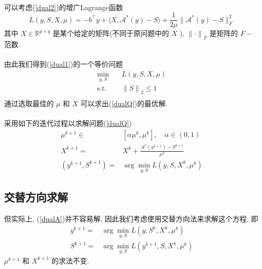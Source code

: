 \documentclass[UTF8]{ctexart}
\begin{document}
			\paragraph{}
				\quad 可以考虑(\ref{dual2})的增广Lagrange函数
				\begin{equation}\label{Lag}
						L(y, S, X, \mu)
					=	-b^\top y + \langle{X, \mathcal{A}^*(y) - S}\rangle + \frac{1}{2\mu} \lVert{\mathcal{A}^*(y) - S}\rVert^2_F
				\end{equation}
				其中 $X \in \mathbb{R}^{p \times q}$ 是某个给定的矩阵(不同于原问题中的 $X$ ), ${\lVert{\cdot}\rVert}_F$ 是矩阵的 $F-$范数.

			\paragraph{}
				\quad 由此我们得到(\ref{dual1})的一个等价问题
				\begin{equation}
					\begin{split}\label{dualQ}
						\min_{y,S} \quad
							& L(y, S, X, \mu)\\
						\text{s.t.} \quad
							& {\lVert{S}\rVert}_2 \le 1\\
					\end{split}
				\end{equation}
				通过选取最佳的 $\mu$ 和 $X$ 可以求出(\ref{dualQ})的最优解.
		
		
			\paragraph{}
				\quad 采用如下的迭代过程以求解问题(\ref{dualQ})
				\begin{equation}
					\begin{split}\label{dualA}
							\mu^{k + 1}
						\in	& [\alpha \mu^k, \mu^k], \quad \alpha \in (0,1)\\
							X^{k + 1}
						=	& X^k + \frac{\mathcal{A}^*(y^{k + 1}) - S^{k + 1}}{\mu^k}\\
							(y^{k + 1}, S^{k + 1}) 
						=	& \arg \min_{y, S}L(y, S, X^k, \mu^k)
					\end{split}
				\end{equation}
		\subsection{交替方向求解}
			\paragraph{}
				\quad 但实际上, (\ref{dualA})并不容易解, 因此我们考虑使用交替方向法来求解这个方程, 即
				\begin{align}
						y^{k + 1}
					=	& \arg \min_{y, S}L(y, S^k, X^k, \mu^k) \label{FixS}\\
						S^{k + 1}
					=	& \arg \min_{y, S}L(y^{k + 1}, S, X^k, \mu^k) \label{FixY}
				\end{align}
				$\mu^{k + 1}$ 和 $X^{k + 1}$ 的求法不变.
\end{document}
